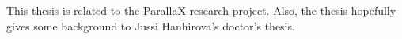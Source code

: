 This thesis is related to the ParallaX research project. Also, the thesis hopefully gives some background to Jussi Hanhirova's doctor's thesis.


